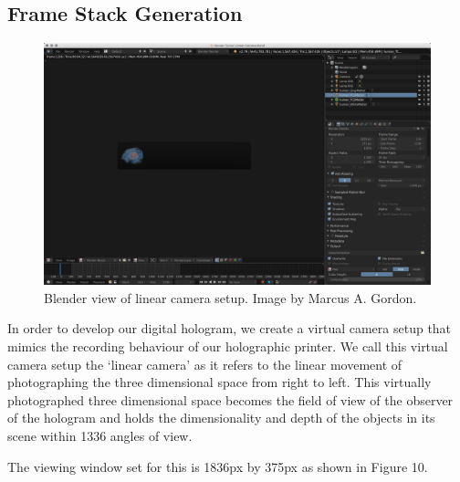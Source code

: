 \subsection{Frame Stack Generation}
\begin{figure}[H]
  \centering
  \includegraphics[width=\linewidth]{img/linCam1.png}
  \caption{Blender view of linear camera setup. Image by Marcus A. Gordon.}
\end{figure}

In order to develop our digital hologram, we create a virtual camera setup that mimics the recording behaviour of our holographic printer.  We call this virtual camera setup the `linear camera' as it refers to the linear movement of photographing the three dimensional space from right to left.  This virtually photographed three dimensional space becomes the field of view of the observer of the hologram and holds the dimensionality and depth of the objects in its scene within 1336 angles of view.

The viewing window set for this is 1836px by 375px as shown in Figure 10.

